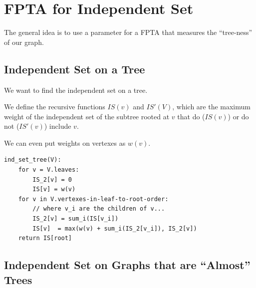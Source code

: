             \section{FPTA for Independent Set} %
            \label{sec:fpta_for_independent_set}
                The general idea is to use a parameter for a FPTA that measures the ``tree-ness'' of our graph.

                \subsection{Independent Set on a Tree} %
                \label{sub:independent_set_on_a_tree}
                    We want to find the independent set on a tree.

                    We define the recursive functions $IS(v)$ and $IS'(V)$, which are the maximum weight of the independent set of the subtree rooted at $v$ that do ($IS(v)$) or do not ($IS'(v)$) include $v$.

                    We can even put weights on vertexes as $w(v)$.

                    \begin{lstlisting}
ind_set_tree(V):
    for v = V.leaves:
        IS_2[v] = 0
        IS[v] = w(v)
    for v in V.vertexes-in-leaf-to-root-order:
        // where v_i are the children of v...
        IS_2[v] = sum_i(IS[v_i])
        IS[v]  = max(w(v) + sum_i(IS_2[v_i]), IS_2[v])
    return IS[root]
                    \end{lstlisting}
                \subsection{Independent Set on Graphs that are ``Almost'' Trees} %
                \label{sub:independent_set_on_graphs_that_are_almost_trees}
